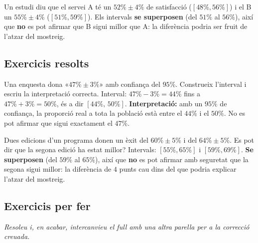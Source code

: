 \begin{exemple}
Un estudi diu que el servei A té un $52\%\pm 4\%$ de satisfacció ($[48\%,56\%]$) i el B un
$55\%\pm 4\%$ ($[51\%,59\%]$). Els intervals \textbf{se superposen} (del $51\%$ al $56\%$),
així que \textbf{no} es pot afirmar que B sigui millor que A: la diferència podria ser fruit
de l'atzar del mostreig.
\end{exemple}

\subsection{Exercicis resolts}

\begin{exresolt}
Una enquesta dona «$47\%\pm 3\%$» amb confiança del $95\%$. Construeix l'interval i escriu
la interpretació correcta.
\solucio
Interval: $47\%-3\%=44\%$ fins a $47\%+3\%=50\%$, és a dir $[44\%,\,50\%]$.
\textbf{Interpretació:} amb un $95\%$ de confiança, la proporció real a tota la població
està entre el $44\%$ i el $50\%$. No es pot afirmar que sigui exactament el $47\%$.
\end{exresolt}

\begin{exresolt}
Dues edicions d'un programa donen un èxit del $60\%\pm 5\%$ i del $64\%\pm 5\%$. Es pot dir
que la segona edició ha estat millor?
\solucio
Intervals: $[55\%,65\%]$ i $[59\%,69\%]$. \textbf{Se superposen} (del $59\%$ al $65\%$),
així que \textbf{no} es pot afirmar amb seguretat que la segona sigui millor: la diferència
de $4$ punts cau dins del que podria explicar l'atzar del mostreig.
\end{exresolt}

\subsection{Exercicis per fer}

\noindent\textit{Resoleu i, en acabar, intercanvieu el full amb una altra parella per a la
correcció creuada.}

